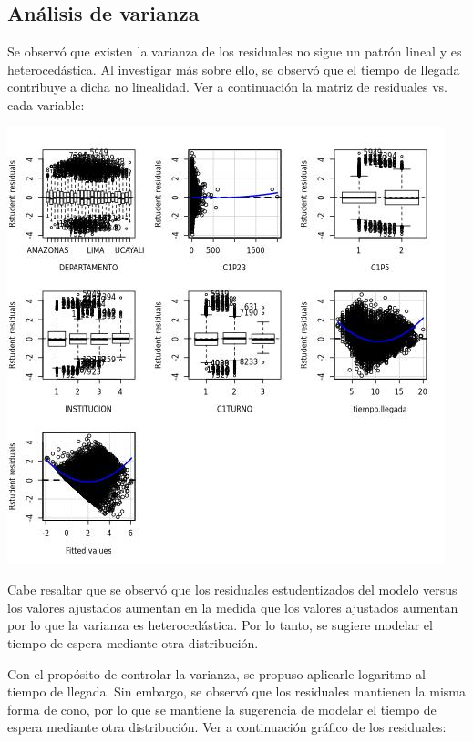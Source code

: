 \documentclass{article}
\begin{document}
\subsection{Análisis de varianza}
Se observó que existen la varianza de los residuales no sigue un patrón lineal y es heterocedástica. Al investigar más sobre ello, se observó que el tiempo de llegada contribuye a dicha no linealidad. Ver a continuación la matriz de residuales vs. cada variable:

\includegraphics[width=\textwidth]{lm_residuales.jpg}

Cabe resaltar que se observó que los residuales estudentizados del modelo versus los valores ajustados aumentan en la medida que los valores ajustados aumentan por lo que la varianza es heterocedástica. Por lo tanto, se sugiere modelar el tiempo de espera mediante otra distribución.

Con el propósito de controlar la varianza, se propuso aplicarle logaritmo al tiempo de llegada. Sin embargo, se observó que los residuales mantienen la misma forma de cono, por lo que se mantiene la sugerencia de modelar el tiempo de espera mediante otra distribución. Ver a continuación gráfico de los residuales:
\end{document}
